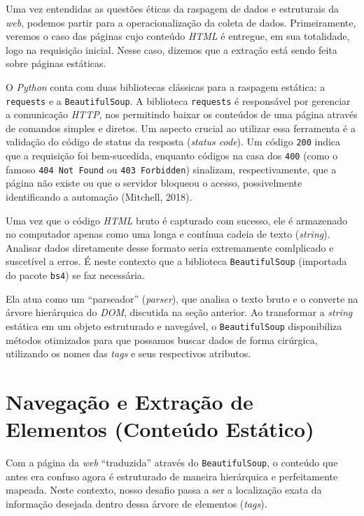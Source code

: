 \documentclass[
  brazilian,
  letterpaper,
  DIV=11,
  numbers=noendperiod]{scrreprt}
\begin{document}
Uma vez entendidas as questões éticas da raspagem de dados e estruturais
da \emph{web}, podemos partir para a operacionalização da coleta de
dados. Primeiramente, veremos o caso das páginas cujo conteúdo
\emph{HTML} é entregue, em sua totalidade, logo na requisição inicial.
Nesse caso, dizemos que a extração está sendo feita sobre páginas
estáticas.

O \emph{Python} conta com duas bibliotecas clássicas para a raspagem
estática: a \texttt{requests} e a \texttt{BeautifulSoup}. A biblioteca
\texttt{requests} é responsável por gerenciar a comunicação \emph{HTTP},
nos permitindo baixar os conteúdos de uma página através de comandos
simples e diretos. Um aspecto crucial ao utilizar essa ferramenta é a
validação do código de status da resposta (\emph{status code}). Um
código \texttt{200} indica que a requisição foi bem-sucedida, enquanto
códigos na casa dos \texttt{400} (como o famoso \texttt{404\ Not\ Found}
ou \texttt{403\ Forbidden}) sinalizam, respectivamente, que a página não
existe ou que o servidor bloqueou o acesso, possivelmente identificando
a automação (Mitchell, 2018).

Uma vez que o código \emph{HTML} bruto é capturado com sucesso, ele é
armazenado no computador apenas como uma longa e contínua cadeia de
texto (\emph{string}). Analisar dados diretamente desse formato seria
extremamente comlplicado e suscetível a erros. É neste contexto que a
biblioteca \texttt{BeautifulSoup} (importada do pacote \texttt{bs4}) se
faz necessária.

Ela atua como um ``parseador'' (\emph{parser}), que analisa o texto
bruto e o converte na árvore hierárquica do \emph{DOM}, discutida na
seção anterior. Ao transformar a \emph{string} estática em um objeto
estruturado e navegável, o \texttt{BeautifulSoup} disponibiliza métodos
otimizados para que possamos buscar dados de forma cirúrgica, utilizando
os nomes das \emph{tags} e seus respectivos atributos.

\section{Navegação e Extração de Elementos (Conteúdo
Estático)}\label{navegauxe7uxe3o-e-extrauxe7uxe3o-de-elementos-conteuxfado-estuxe1tico}

Com a página da \emph{web} ``traduzida'' através do
\texttt{BeautifulSoup}, o conteúdo que antes era confuso agora é
estruturado de maneira hierárquica e perfeitamente mapeada. Neste
contexto, nosso desafio passa a ser a localização exata da informação
desejada dentro dessa árvore de elementos (\emph{tags}).
\end{document}
